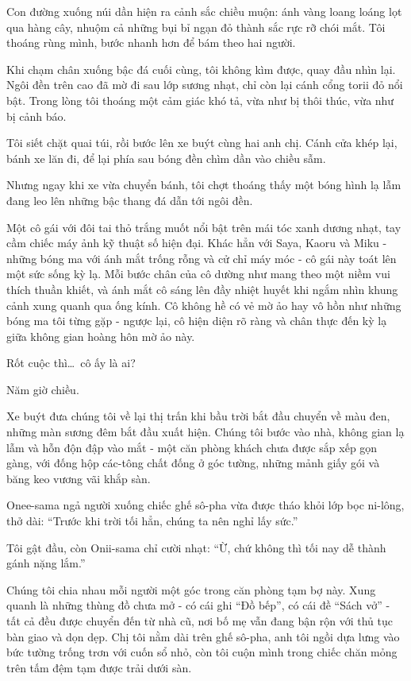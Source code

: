 \documentclass[../main.tex]{subfiles}
\begin{document}
Con đường xuống núi dần hiện ra cảnh sắc chiều muộn: ánh vàng loang loáng lọt qua hàng cây, nhuộm cả những bụi bỉ ngạn đỏ thành sắc rực rỡ chói mắt. Tôi thoáng rùng mình, bước nhanh hơn để bám theo hai người.

Khi chạm chân xuống bậc đá cuối cùng, tôi không kìm được, quay đầu nhìn lại. Ngôi đền trên cao đã mờ đi sau lớp sương nhạt, chỉ còn lại cánh cổng torii đỏ nổi bật. Trong lòng tôi thoáng một cảm giác khó tả, vừa như bị thôi thúc, vừa như bị cảnh báo.

Tôi siết chặt quai túi, rồi bước lên xe buýt cùng hai anh chị. Cánh cửa khép lại, bánh xe lăn đi, để lại phía sau bóng đền chìm dần vào chiều sẫm.

Nhưng ngay khi xe vừa chuyển bánh, tôi chợt thoáng thấy một bóng hình lạ lẫm đang leo lên những bậc thang đá dẫn tới ngôi đền.

Một cô gái với đôi tai thỏ trắng muốt nổi bật trên mái tóc xanh dương nhạt, tay cầm chiếc máy ảnh kỹ thuật số hiện đại. Khác hẳn với Saya, Kaoru và Miku - những bóng ma với ánh mắt trống rỗng và cử chỉ máy móc - cô gái này toát lên một sức sống kỳ lạ. Mỗi bước chân của cô dường như mang theo một niềm vui thích thuần khiết, và ánh mắt cô sáng lên đầy nhiệt huyết khi ngắm nhìn khung cảnh xung quanh qua ống kính. Cô không hề có vẻ mờ ảo hay vô hồn như những bóng ma tôi từng gặp - ngược lại, cô hiện diện rõ ràng và chân thực đến kỳ lạ giữa không gian hoàng hôn mờ ảo này.

Rốt cuộc thì\dots\ cô ấy là ai?

\ct

Năm giờ chiều.

Xe buýt đưa chúng tôi về lại thị trấn khi bầu trời bắt đầu chuyển về màu đen, những màn sương đêm bắt đầu xuất hiện. Chúng tôi bước vào nhà, không gian lạ lẫm và hỗn độn đập vào mắt - một căn phòng khách chưa được sắp xếp gọn gàng, với đống hộp các-tông chất đống ở góc tường, những mảnh giấy gói và băng keo vương vãi khắp sàn.

Onee-sama ngả người xuống chiếc ghế sô-pha vừa được tháo khỏi lớp bọc ni-lông, thở dài: ``Trước khi trời tối hẳn, chúng ta nên nghỉ lấy sức.''

Tôi gật đầu, còn Onii-sama chỉ cười nhạt: ``Ừ, chứ không thì tối nay dễ thành gánh nặng lắm.''

Chúng tôi chia nhau mỗi người một góc trong căn phòng tạm bợ này. Xung quanh là những thùng đồ chưa mở - có cái ghi ``Đồ bếp'', có cái đề ``Sách vở'' - tất cả đều được chuyển đến từ nhà cũ, nơi bố mẹ vẫn đang bận rộn với thủ tục bàn giao và dọn dẹp. Chị tôi nằm dài trên ghế sô-pha, anh tôi ngồi dựa lưng vào bức tường trống trơn với cuốn sổ nhỏ, còn tôi cuộn mình trong chiếc chăn mỏng trên tấm đệm tạm được trải dưới sàn.
\end{document}
